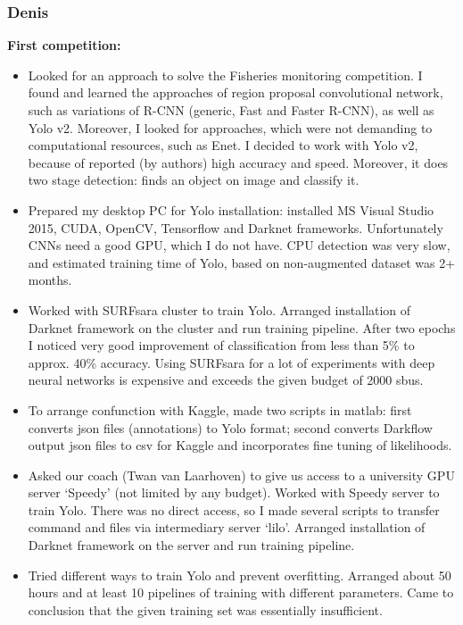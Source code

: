 \documentclass[a4paper]{article}
\begin{document}
\subsubsection*{Denis}

\textbf{First competition:}

\begin{itemize}
	\item Looked for an approach to solve the Fisheries monitoring competition. I found and learned the approaches of region proposal convolutional network, such as variations of R-CNN (generic, Fast and Faster R-CNN), as well as Yolo v2. Moreover, I looked for approaches, which were not demanding to computational resources, such as Enet. I decided to work with Yolo v2, because of reported (by authors) high accuracy and speed. Moreover, it does two stage detection: finds an object on image and classify it.
	\item Prepared my desktop PC for Yolo installation: installed MS Visual Studio 2015, CUDA, OpenCV, Tensorflow and Darknet frameworks. Unfortunately CNNs need a good GPU, which I do not  have. CPU detection was very slow, and estimated training time of Yolo, based on non-augmented dataset was 2+ months.
	\item Worked with SURFsara cluster to train Yolo. Arranged installation of Darknet framework on the cluster and run training pipeline. After two epochs I noticed very good improvement of classification from less than 5\% to approx. 40\% accuracy. Using SURFsara for a lot of experiments with deep neural networks is expensive and exceeds the given budget of 2000 sbus.
	\item To arrange confunction with Kaggle, made two scripts in matlab: first converts json files (annotations) to Yolo format; second converts Darkflow output json files to csv for Kaggle and incorporates fine tuning of likelihoods.
	\item Asked our coach (Twan van Laarhoven) to give us access to a university GPU server ‘Speedy’ (not limited by any budget). Worked with Speedy server to train Yolo. There was no direct access, so I made several scripts to transfer command and files via intermediary server ‘lilo’. Arranged installation of Darknet framework on the server and run training pipeline.
	\item Tried different ways to train Yolo and prevent overfitting. Arranged about 50 hours and at least 10 pipelines of training with different parameters. Came to conclusion that the given training set was essentially insufficient. 

\end{itemize}
\end{document}
